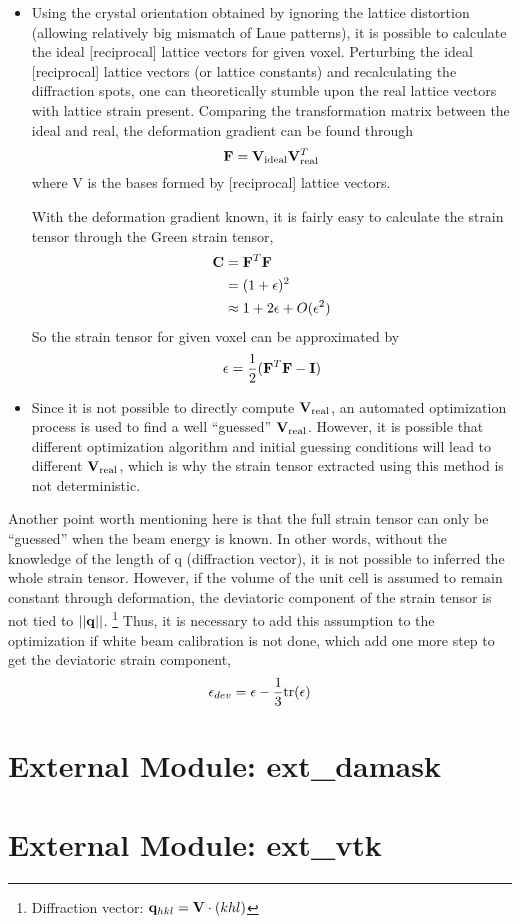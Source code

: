 \documentclass[12pt]{scrartcl}
\begin{document}
\begin{enumerate}
\begin{itemize}
	\item
	Using the crystal orientation obtained by ignoring the lattice distortion (allowing relatively big mismatch of Laue patterns), it is possible to calculate the ideal [reciprocal] lattice vectors for given voxel.
	Perturbing the ideal [reciprocal] lattice vectors (or lattice constants) and recalculating the diffraction spots, one can theoretically stumble upon the real lattice vectors with lattice strain present. 
	Comparing the transformation matrix between the ideal and real, the deformation gradient can be found through
\[
	\mathbf{F} = \mathbf{V}_\text{ideal} \mathbf{V}_\text{real}^T
\]
where \tnsr V is the bases formed by [reciprocal] lattice vectors.
	
	With the deformation gradient known, it is fairly easy to calculate the strain tensor through the Green strain tensor,
\begin{align*}
	\mathbf{C} &= \mathbf{F}^T \mathbf{F} \\
	           &= (1 + \mathbf{\epsilon})^2 \\
	           &\approx 1 + 2 \mathbf{\epsilon} + O(\mathbf{\epsilon}^2)
\end{align*}
	So the strain tensor for given voxel can be approximated by
\[
	\mathbf{\epsilon} = \dfrac{1}{2}(\mathbf{F}^T \mathbf{F} - \mathbf{I})
\]

	\item
	Since it is not possible to directly compute $\mathbf{V}_\text{real}$, an automated optimization process is used to find a well ``guessed'' $\mathbf{V}_\text{real}$.
	However, it is possible that different optimization algorithm and initial guessing conditions will lead to different $\mathbf{V}_\text{real}$, which is why the strain tensor extracted using this method is not deterministic.

	\end{itemize} 
\end{enumerate}

Another point worth mentioning here is that the full strain tensor can only be ``guessed'' when the beam energy is known.
In other words, without the knowledge of the length of \tnsr q (diffraction vector), it is not possible to inferred the whole strain tensor.
However, if the volume of the unit cell is assumed to remain constant through deformation, the deviatoric component of the strain tensor is not tied to $||\mathbf{q}||$.
\footnote{Diffraction vector: $\mathbf{q}_{hkl} = \mathbf{V} \cdot (khl) $}
Thus, it is necessary to add this assumption to the optimization if white beam calibration is not done, which add one more step to get the deviatoric strain component,
\[
	\mathbf{\epsilon}_{dev} = \mathbf{\epsilon} - \dfrac{1}{3}\text{tr}(\mathbf{\epsilon})
\]
\section{External Module: ext\_damask}

\section{External Module: ext\_vtk}
\end{document}
